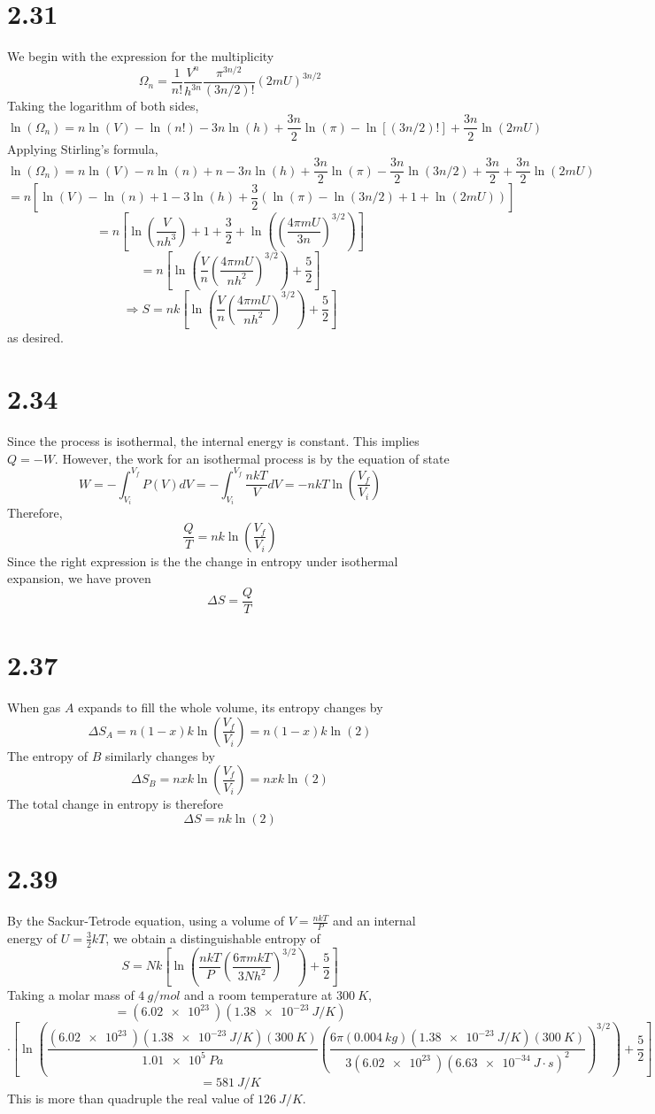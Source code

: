 \documentclass{article}
\begin{document}
\section*{2.31}
We begin with the expression for the multiplicity
\[\Omega_{n}=\frac{1}{n!}\frac{V^{n}}{h^{3n}}\frac{\pi^{3n/2}}{(3n/2)!}\left( 2mU \right)^{3n/2}\]
Taking the logarithm of both sides,
\[\ln(\Omega_{n})=n\ln(V)-\ln(n!)-3n\ln(h)+\frac{3n}{2}\ln(\pi)-\ln[(3n/2)!]+\frac{3n}{2}\ln(2mU)\]
Applying Stirling's formula,
\[\ln(\Omega_{n})=n\ln(V)-n\ln(n) + n -3n\ln(h) +\frac{3n}{2}\ln(\pi)-\frac{3n}{2}\ln(3n/2)+\frac{3n}{2}+\frac{3n}{2}\ln(2mU)\]
\[=n\left[ \ln(V)-\ln(n)+1-3\ln(h) +\frac{3}{2}\left( \ln(\pi)-\ln(3n/2) +1+\ln(2mU)\right) \right]\]
\[=n\left[ \ln\left(\frac{V}{nh^{3}}  \right) +1 +\frac{3}{2}+ \ln\left( \left( \frac{4\pi mU}{3n}\right)^{3/2} \right)\right]\]
\[=n\left[ \ln\left( \frac{V}{n} \left( \frac{4\pi mU}{nh^{2}} \right)^{3/2}\right)+\frac{5}{2} \right]\]
\[\Rightarrow S=nk\left[ \ln\left( \frac{V}{n} \left( \frac{4\pi mU}{nh^{2}} \right)^{3/2}\right)+\frac{5}{2} \right]\]
as desired.

\section*{2.34}
Since the process is isothermal, the internal energy is constant. This implies $Q=-W$. However, the work for an isothermal process is by the equation of state
\[W=-\int_{V_{i}}^{V_{f}}P(V)dV=-\int_{V_{i}}^{V_{f}}\frac{nkT}{V}dV=-nkT\ln\left(\frac{V_{f}}{V_{i}}\right)\]
Therefore,
\[\frac{Q}{T}=nk\ln\left( \frac{V_{f}}{V_{i}} \right)\]
Since the right expression is the the change in entropy under isothermal expansion, we have proven
\[\Delta S=\frac{Q}{T}\]

\section*{2.37}
When gas $A$ expands to fill the whole volume, its entropy changes by
\[\Delta S_{A}=n(1-x)k\ln\left( \frac{V_{f}}{V_{i}} \right)=n(1-x)k\ln(2)\]
The entropy of $B$ similarly changes by
\[\Delta S_{B}=nxk\ln\left( \frac{V_{f}}{V_{i}} \right)=nxk\ln(2)\]
The total change in entropy is therefore
\[\Delta S=nk\ln(2)\]


\section*{2.39}
By the Sackur-Tetrode equation, using  a volume of $V=\frac{nkT}{P}$ and an internal energy of $U=\frac{3}{2}kT$, we obtain a distinguishable entropy of
\[S=Nk\left[ \ln\left( \frac{nkT}{P}\left( \frac{6\pi m k T}{3Nh^{2}} \right)^{3/2} \right)+\frac{5}{2} \right]\]
Taking a molar mass of $\SI{4}{g/mol}$ and a room temperature at $\SI{300}{K}$,
\[=(\SI{6.02e23}{})(\SI{1.38e-23}{J/K})\]\[\cdot\left[ \ln\left( \frac{(\SI{6.02e23}{})(\SI{1.38e-23}{J/K})(\SI{300}{K})}{\SI{1.01e5}{Pa}}\left( \frac{6\pi(\SI{0.004}{kg})(\SI{1.38e-23}{J/K})(\SI{300}{K})}{3(\SI{6.02e23}{})(\SI{6.63e-34}{J\cdot s})^{2}} \right)^{3/2}\right) +\frac{5}{2}\right]\]
\[=\SI{581}{J/K}\]
This is more than quadruple the real value of $\SI{126}{J/K}$.
\end{document}
